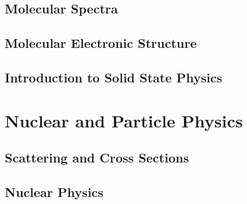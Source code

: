\documentclass[a4paper, 11pt]{book}
\newcommand{\1}{\opr{\mathds{1}}}
\begin{document}
	\chapter{Molecular Spectra}
		
	\chapter{Molecular Electronic Structure}
		
	\chapter{Introduction to Solid State Physics}
		
%		
%		
%		
%		
%		
\part{Nuclear and Particle Physics}
	\chapter{Scattering and Cross Sections}
	
	\chapter{Nuclear Physics}
	
\end{document}
